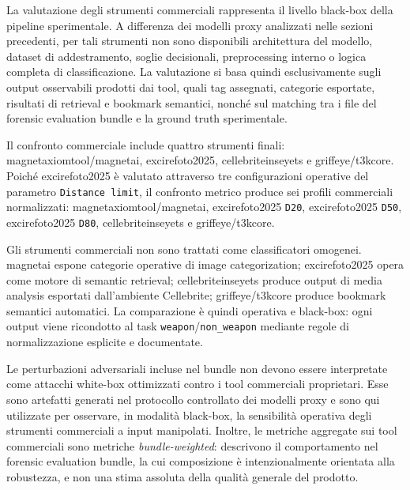 La valutazione degli strumenti commerciali rappresenta il livello black-box della
pipeline sperimentale. A differenza dei modelli proxy analizzati nelle sezioni
precedenti, per tali strumenti non sono disponibili architettura del modello,
dataset di addestramento, soglie decisionali, preprocessing interno o logica
completa di classificazione. La valutazione si basa quindi esclusivamente sugli output osservabili prodotti
dai tool, quali tag assegnati, categorie esportate, risultati di retrieval e
bookmark semantici, nonché sul matching tra i file del forensic evaluation
bundle e la ground truth sperimentale.

Il confronto commerciale include quattro strumenti finali:
\gls{magnetaxiomtool}/\gls{magnetai}, \gls{excirefoto2025},
\gls{cellebriteinseyets} e \gls{griffeye}/\gls{t3kcore}. Poiché
\gls{excirefoto2025} è valutato attraverso tre configurazioni operative del
parametro \texttt{Distance limit}, il confronto metrico produce sei profili
commerciali normalizzati: \gls{magnetaxiomtool}/\gls{magnetai},
\gls{excirefoto2025} \texttt{D20}, \gls{excirefoto2025} \texttt{D50},
\gls{excirefoto2025} \texttt{D80}, \gls{cellebriteinseyets} e
\gls{griffeye}/\gls{t3kcore}.

Gli strumenti commerciali non sono trattati come classificatori omogenei.
\gls{magnetai} espone categorie operative di image categorization;
\gls{excirefoto2025} opera come motore di semantic retrieval;
\gls{cellebriteinseyets} produce output di media analysis esportati
dall'ambiente Cellebrite; \gls{griffeye}/\gls{t3kcore} produce bookmark
semantici automatici. La comparazione è quindi operativa e black-box: ogni output
viene ricondotto al task \texttt{weapon}/\texttt{non\_weapon} mediante regole di
normalizzazione esplicite e documentate.

Le perturbazioni adversariali incluse nel bundle non devono essere interpretate
come attacchi white-box ottimizzati contro i tool commerciali proprietari. Esse
sono artefatti generati nel protocollo controllato dei modelli proxy e sono qui
utilizzate per osservare, in modalità black-box, la sensibilità operativa degli
strumenti commerciali a input manipolati. Inoltre, le metriche aggregate sui
tool commerciali sono metriche \emph{bundle-weighted}: descrivono il
comportamento nel forensic evaluation bundle, la cui composizione è
intenzionalmente orientata alla robustezza, e non una stima assoluta della
qualità generale del prodotto.

